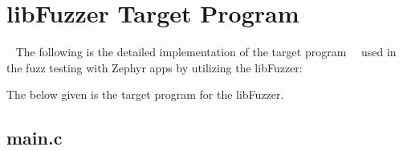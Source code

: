 \vspace{21.5pt}
\clearpage

\chapter{libFuzzer Target Program}~\label{appx:second}
The following is the detailed implementation of the
target program~\cite{FuzzingE54:online}~\cite{zephyrsa35:online} used in
the fuzz testing with Zephyr apps by utilizing the libFuzzer:

The below given is the target program for the libFuzzer.
\section*{main.c}

